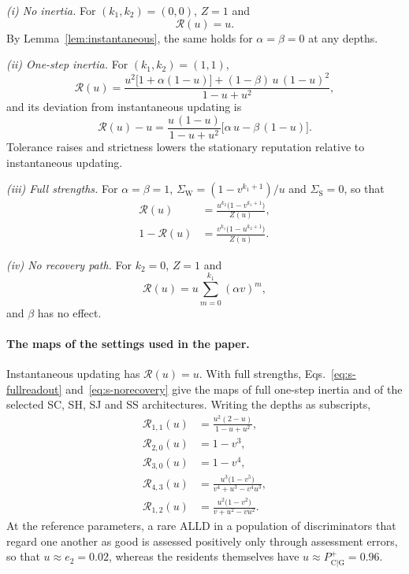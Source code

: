\documentclass[10pt]{wlscirep}
\newcommand{\Rmap}{\mathscr{R}}            %
\newcommand{\Pp}[1]{P^{+}_{\mathrm{#1}}}   %
\theoremstyle{plain}
\theoremstyle{remark}
\begin{document}
\textit{(i) No inertia.} For $(k_1,k_2)=(0,0)$, $Z=1$ and
\begin{equation}
\Rmap(u)=u.
\label{eq:s-linear}
\end{equation}
By Lemma~\ref{lem:instantaneous}, the same holds for $\alpha=\beta=0$ at any depths.

\textit{(ii) One-step inertia.} For $(k_1,k_2)=(1,1)$,
\begin{equation}
\Rmap(u)=\frac{u^2\bigl[1+\alpha(1-u)\bigr]+(1-\beta)\,u\,(1-u)^2}{1-u+u^2},
\label{eq:s-onestep-map}
\end{equation}
and its deviation from instantaneous updating is
\begin{equation}
\Rmap(u)-u=\frac{u\,(1-u)}{1-u+u^2}\bigl[\alpha\,u-\beta\,(1-u)\bigr].
\label{eq:s-onestep}
\end{equation}
Tolerance raises and strictness lowers the stationary reputation relative to instantaneous updating.

\textit{(iii) Full strengths.} For $\alpha=\beta=1$, $\Sigma_{\mathrm W}=(1-v^{k_1+1})/u$ and $\Sigma_{\mathrm S}=0$, so that
\begin{equation}
\begin{aligned}
\Rmap(u)&=\frac{u^{k_2}\bigl(1-v^{k_1+1}\bigr)}{Z(u)},\\[2pt]
1-\Rmap(u)&=\frac{v^{k_1}\bigl(1-u^{k_2+1}\bigr)}{Z(u)}.
\end{aligned}
\label{eq:s-fullreadout}
\end{equation}

\textit{(iv) No recovery path.} For $k_2=0$, $Z=1$ and
\begin{equation}
\Rmap(u)=u\sum_{m=0}^{k_1}(\alpha v)^m,
\label{eq:s-norecovery}
\end{equation}
and $\beta$ has no effect.

\paragraph{The maps of the settings used in the paper.} Instantaneous updating has $\Rmap(u)=u$. With full strengths, Eqs.~\eqref{eq:s-fullreadout} and~\eqref{eq:s-norecovery} give the maps of full one-step inertia and of the selected SC, SH, SJ and SS architectures. Writing the depths as subscripts,
\begin{equation}
\begin{aligned}
\Rmap_{1,1}(u)&=\frac{u^2(2-u)}{1-u+u^2},\\[2pt]
\Rmap_{2,0}(u)&=1-v^3,\\[2pt]
\Rmap_{3,0}(u)&=1-v^4,\\[2pt]
\Rmap_{4,3}(u)&=\frac{u^3\bigl(1-v^5\bigr)}{v^4+u^3-v^4u^3},\\[2pt]
\Rmap_{1,2}(u)&=\frac{u^2\bigl(1-v^2\bigr)}{v+u^2-vu^2}.
\end{aligned}
\label{eq:s-selected-maps}
\end{equation}
At the reference parameters, a rare ALLD in a population of discriminators that regard one another as good is assessed positively only through assessment errors, so that $u\approx e_2=0.02$, whereas the residents themselves have $u\approx\Pp{C|G}=0.96$.
\end{document}
